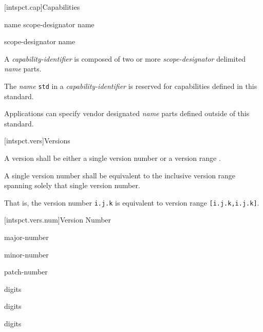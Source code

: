 [intspct.cap]{Capabilities}

\pnum
\begin{bnf}

\br
	name scope-designator name 

\br
	scope-designator name 

\br
	\br
	\br
	\br
	\terminal{_}

\br
	\terminal{:}

\end{bnf}

\pnum
A \emph{capability-identifier} is composed of two or more \emph{scope-designator}
delimited \emph{name} parts.

\pnum
The \emph{name} \verb|std| in a \emph{capability-identifier} is reserved for
capabilities defined in this standard.

\pnum
Applications can specify vendor designated \emph{name} parts defined outside of
this standard.

[intspct.vers]{Versions}

\pnum
A version shall be either a single version number  or a
version range .

\pnum
A single version number shall be equivalent to the inclusive version range
spanning solely that single version number.

\begin{note}
That is, the version number \verb|i.j.k| is equivalent to version range
\verb|[i.j.k,i.j.k]|.
\end{note}

[intspct.vers.num]{Version Number}

\pnum
\begin{bnf}

\br
	major-number 

\br
	 minor-number 

\br
	 patch-number

\br
	digits

\br
	digits

\br
	digits

\br
	\br

\end{bnf}

